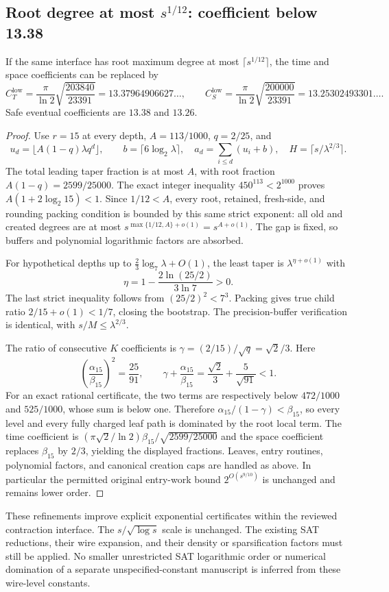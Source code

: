 \subsection{Root degree at most \texorpdfstring{$s^{1/12}$}{s to the 1/12}: coefficient below 13.38}

\begin{theorem}\label{cached:low}
If the same interface has root maximum degree at most
$\lceil s^{1/12}\rceil$, the time and space coefficients can be replaced by
\[
 C_T^{\mathrm{low}}=\frac\pi{\ln2}\sqrt{\frac{203840}{23391}}
      =13.37964906627\ldots,
 \qquad
 C_S^{\mathrm{low}}=\frac\pi{\ln2}\sqrt{\frac{200000}{23391}}
      =13.25302493301\ldots.
\]
Safe eventual coefficients are $13.38$ and $13.26$.
\end{theorem}
\begin{proof}
Use $r=15$ at every depth, $A=113/1000$, $q=2/25$, and
\[
 u_d=\lfloor A(1-q)\lambda q^d\rfloor,\qquad
 b=\lceil6\log_2\lambda\rceil,\quad
 a_d=\sum_{i\le d}(u_i+b),\quad
 H=\lceil s/\lambda^{2/3}\rceil.
\]
The total leading taper fraction is at most $A$, with root fraction
$A(1-q)=2599/25000$.
The exact integer inequality $450^{113}<2^{1000}$ proves
$A(1+2\log_2 15)<1$. Since $1/12<A$, every root, retained, fresh-side,
and rounding packing condition is bounded by this same strict exponent:
all old and created degrees are at most
$s^{\max\{1/12,A\}+o(1)}=s^{A+o(1)}$.
The gap is fixed, so buffers and polynomial logarithmic factors are absorbed.

For hypothetical depths up to $\tfrac23\log_7\lambda+O(1)$, the least
taper is $\lambda^{\eta+o(1)}$ with
\[
 \eta=1-\frac{2\ln(25/2)}{3\ln7}>0.
\]
The last strict inequality follows from $(25/2)^2<7^3$.
Packing gives true child ratio $2/15+o(1)<1/7$, closing the bootstrap.
The precision-buffer verification is identical, with $s/M\le\lambda^{2/3}$.

The ratio of consecutive $K$ coefficients is
$\gamma=(2/15)/\sqrt q=\sqrt2/3$.
Here
\[
 \left(\frac{\alpha_{15}}{\beta_{15}}\right)^2=\frac{25}{91},
 \qquad
 \gamma+\frac{\alpha_{15}}{\beta_{15}}
 =\frac{\sqrt2}{3}+\frac5{\sqrt{91}}<1.
\]
For an exact rational certificate, the two terms are respectively below
$472/1000$ and $525/1000$, whose sum is below one. Therefore
$\alpha_{15}/(1-\gamma)<\beta_{15}$, so every level and every fully
charged leaf path is dominated by the root local term. The time coefficient
is $(\pi\sqrt2/\ln2)\beta_{15}/\sqrt{2599/25000}$ and the space
coefficient replaces $\beta_{15}$ by $2/3$, yielding the displayed fractions.
Leaves, entry routines, polynomial factors, and canonical creation caps are
handled as above. In particular the permitted original entry-work bound
$2^{O(s^{9/10})}$ is unchanged and remains lower order.
\end{proof}

These refinements improve explicit exponential certificates within the
reviewed contraction interface. The $s/\sqrt{\log s}$ scale is unchanged.
The existing SAT reductions, their wire expansion, and their density or
sparsification factors must still be applied. No smaller unrestricted SAT
logarithmic order or numerical domination of a separate unspecified-constant
manuscript is inferred from these wire-level constants.
